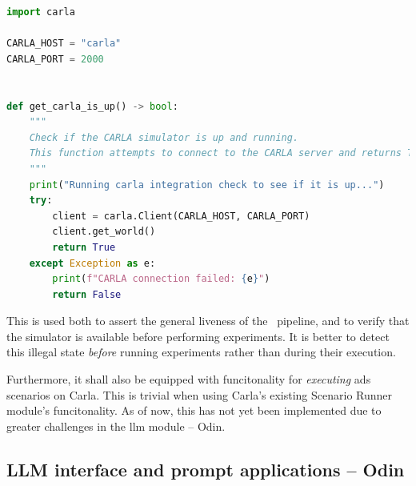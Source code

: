 \begin{lstlisting}[caption={Exerpt from carla\_interface.py, demonstrating the implementation of a Carla health check.}, label={lst:odinCarlaHealthCheck}, language={Python}]
import carla

CARLA_HOST = "carla"
CARLA_PORT = 2000


def get_carla_is_up() -> bool:
    """
    Check if the CARLA simulator is up and running.
    This function attempts to connect to the CARLA server and returns True if successful, otherwise False.
    """
    print("Running carla integration check to see if it is up...")
    try:
        client = carla.Client(CARLA_HOST, CARLA_PORT)
        client.get_world()
        return True
    except Exception as e:
        print(f"CARLA connection failed: {e}")
        return False
\end{lstlisting}

This is used both to assert the general liveness of the \hefe~pipeline, and to
verify that the simulator is available before performing experiments. It is
better to detect this illegal state \emph{before} running experiments rather
than during their execution.

Furthermore, it shall also be equipped with funcitonality for \emph{executing} \acrshort{ads}
scenarios on Carla. This is trivial when using Carla's existing Scenario Runner
module's funcitonality. As of now, this has not yet been implemented due to
greater challenges in the \acrshort{llm} module -- Odin.



\subsection{LLM interface and prompt applications -- Odin}\label{sec:odinImplementation}


